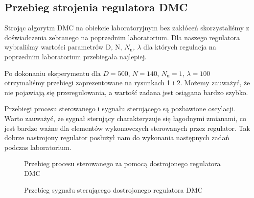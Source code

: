 \subsection{Przebieg strojenia regulatora DMC}
Strojąc algorytm DMC na obiekcie laboratoryjnym bez zakłóceń skorzystaliśmy z doświadczenia zebranego na poprzednim laboratorium. Dla naszego regulatora wybraliśmy wartości parametrów D, N, $N_\mathrm{u}$, $\lambda$ dla których regulacja na poprzednim laboratorium przebiegała najlepiej.

Po dokonaniu eksperymentu dla $D = 500$, $N = 140$, $N_\mathrm{u} = 1$, 
$\lambda = 100$ otrzymaliśmy przebiegi zaprezentowane na rysunkach 
\ref{lab_zad4_lab_proces_wykres} i \ref{lab_zad4_lab_ster}. Możemy zauważyć, 
że nie pojawiają się przeregulowania, a wartość zadana jest osiągana bardzo szybko. 

\indent Przebiegi procesu sterowanego i sygnału sterującego są pozbawione oscylacji. 
Warto zauważyć, że sygnał sterujący charakteryzuje się łagodnymi zmianami, 
co jest bardzo ważne dla elementów wykonawczych sterowanych przez regulator. 
Tak dobrze nastrojony regulator posłużył nam do wykonania następnych 
zadań podczas laboratorium. 
\begin{figure}[t]
    
    \centering
    \caption{Przebieg procesu sterowanego za pomocą dostrojonego regulatora DMC}
    \label{lab_zad4_lab_proces_wykres}
\end{figure}

\begin{figure}[b]
    
    \centering
    \caption{Przebieg sygnału sterującego dostrojonego regulatora DMC}
    \label{lab_zad4_lab_ster}
\end{figure}
\FloatBarrier